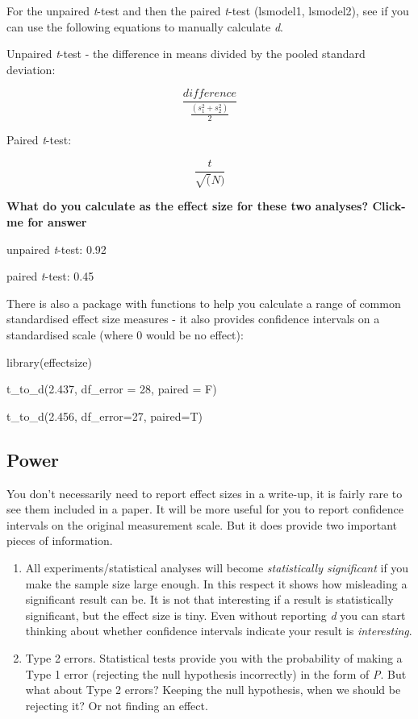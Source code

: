 \documentclass[
]{book}
\newenvironment{Shaded}{\begin{snugshade}}{\end{snugshade}}
\newcommand{\AttributeTok}[1]{\textcolor[rgb]{0.77,0.63,0.00}{#1}}
\newcommand{\DecValTok}[1]{\textcolor[rgb]{0.00,0.00,0.81}{#1}}
\newcommand{\FloatTok}[1]{\textcolor[rgb]{0.00,0.00,0.81}{#1}}
\newcommand{\FunctionTok}[1]{\textcolor[rgb]{0.00,0.00,0.00}{#1}}
\newcommand{\NormalTok}[1]{#1}
\begin{document}
For the unpaired \emph{t}-test and then the paired \emph{t}-test (lsmodel1, lsmodel2), see if you can use the following equations to manually calculate \emph{d}.

Unpaired \emph{t}-test - the difference in means divided by the pooled standard deviation:

\[ \frac{difference}{\frac{(s^2_1+s^2_2)}{2}}\]

Paired \emph{t}-test:

\[ \frac{t}{\sqrt(N)}\]

\textbf{What do you calculate as the effect size for these two analyses? Click-me for answer}

unpaired \emph{t}-test: 0.92

paired \emph{t}-test: 0.45

There is also a package with functions to help you calculate a range of common standardised effect size measures - it also provides confidence intervals on a standardised scale (where 0 would be no effect):

\begin{Shaded}
\begin{Highlighting}[]
\FunctionTok{library}\NormalTok{(effectsize)}


\FunctionTok{t\_to\_d}\NormalTok{(}\FloatTok{2.437}\NormalTok{, }\AttributeTok{df\_error =} \DecValTok{28}\NormalTok{, }\AttributeTok{paired =}\NormalTok{ F)}

\FunctionTok{t\_to\_d}\NormalTok{(}\FloatTok{2.456}\NormalTok{, }\AttributeTok{df\_error=}\DecValTok{27}\NormalTok{, }\AttributeTok{paired=}\NormalTok{T)}
\end{Highlighting}
\end{Shaded}

\hypertarget{power}{%
\subsection{Power}\label{power}}

You don't necessarily need to report effect sizes in a write-up, it is fairly rare to see them included in a paper. It will be more useful for you to report confidence intervals on the original measurement scale. But it does provide two important pieces of information.

\begin{enumerate}
\def\labelenumi{\arabic{enumi})}
\item
  All experiments/statistical analyses will become \emph{statistically significant} if you make the sample size large enough. In this respect it shows how misleading a significant result can be. It is not that interesting if a result is statistically significant, but the effect size is tiny. Even without reporting \emph{d} you can start thinking about whether confidence intervals indicate your result is \emph{interesting}.
\item
  Type 2 errors. Statistical tests provide you with the probability of making a Type 1 error (rejecting the null hypothesis incorrectly) in the form of \emph{P}. But what about Type 2 errors? Keeping the null hypothesis, when we should be rejecting it? Or not finding an effect.
\end{enumerate}
\end{document}
